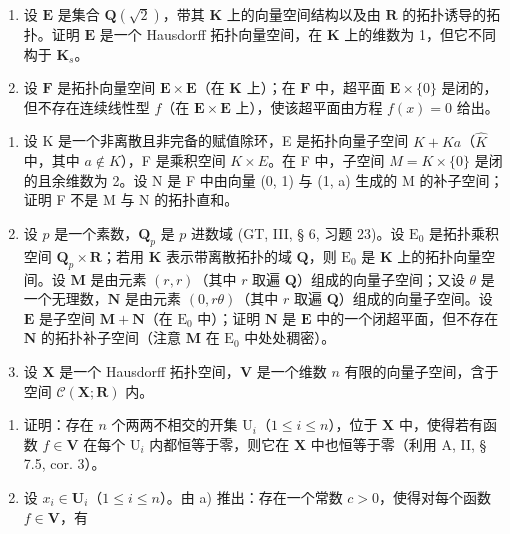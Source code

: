 \begin{enumerate}
\def\labelenumi{\alph{enumi})}
\item
  设 \(\mathbf{E}\) 是集合 \(\mathbf{Q}(\sqrt{2})\)，带其 \(\mathbf{K}\) 上的向量空间结构以及由 \(\mathbf{R}\) 的拓扑诱导的拓扑。证明 \(\mathbf{E}\) 是一个 Hausdorff 拓扑向量空间，在 \(\mathbf{K}\) 上的维数为 1，但它不同构于 \(\mathbf{K}_s\)。
\item
  设 \(\mathbf{F}\) 是拓扑向量空间 \(\mathbf{E} \times \mathbf{E}\)（在 \(\mathbf{K}\) 上）；在 \(\mathbf{F}\) 中，超平面 \(\mathbf{E} \times \{0\}\) 是闭的，但不存在连续线性型 \(f\)（在 \(\mathbf{E} \times \mathbf{E}\) 上），使该超平面由方程 \(f(x) = 0\) 给出。
\end{enumerate}

\begin{enumerate}
\def\labelenumi{\arabic{enumi})}
\setcounter{enumi}{6}
\item
  设 K 是一个非离散且非完备的赋值除环，E 是拓扑向量子空间 \(K + Ka\)（\(\hat{K}\) 中，其中 \(a \notin K\)），F 是乘积空间 \(K \times E\)。在 F 中，子空间 \(M = K \times \{0\}\) 是闭的且余维数为 2。设 N 是 F 中由向量 (0, 1) 与 (1, a) 生成的 M 的补子空间；证明 F 不是 M 与 N 的拓扑直和。
\item
  设 \(p\) 是一个素数，\(\mathbf{Q}_p\) 是 \(p\) 进数域 (GT, III, § 6, 习题 23)。设 \(\mathrm{E}_0\) 是拓扑乘积空间 \(\mathbf{Q}_p \times \mathbf{R}\)；若用 \(\mathbf{K}\) 表示带离散拓扑的域 \(\mathbf{Q}\)，则 \(\mathrm{E}_0\) 是 \(\mathbf{K}\) 上的拓扑向量空间。设 \(\mathbf{M}\) 是由元素 \((r, r)\)（其中 \(r\) 取遍 \(\mathbf{Q}\)）组成的向量子空间；又设 \(\theta\) 是一个无理数，\(\mathbf{N}\) 是由元素 \((0, r\theta)\)（其中 \(r\) 取遍 \(\mathbf{Q}\)）组成的向量子空间。设 \(\mathbf{E}\) 是子空间 \(\mathbf{M} + \mathbf{N}\)（在 \(\mathrm{E}_0\) 中）；证明 \(\mathbf{N}\) 是 \(\mathbf{E}\) 中的一个闭超平面，但不存在 \(\mathbf{N}\) 的拓扑补子空间（注意 \(\mathbf{M}\) 在 \(\mathrm{E}_0\) 中处处稠密）。
\item
  设 \(\mathbf{X}\) 是一个 Hausdorff 拓扑空间，\(\mathbf{V}\) 是一个维数 \(n\) 有限的向量子空间，含于空间 \(\mathcal{C}(\mathbf{X};\mathbf{R})\) 内。
\end{enumerate}

\begin{enumerate}
\def\labelenumi{\alph{enumi})}
\item
  证明：存在 \(n\) 个两两不相交的开集 \(\mathrm{U}_i\)（\(1 \leqslant i \leqslant n\)），位于 \(\mathbf{X}\) 中，使得若有函数 \(f \in \mathbf{V}\) 在每个 \(\mathrm{U}_i\) 内都恒等于零，则它在 \(\mathbf{X}\) 中也恒等于零（利用 A, II, § 7.5, cor. 3）。
\item
  设 \(x_{i} \in \mathbf{U}_{i}\)（\(1 \leqslant i \leqslant n\)）。由 a) 推出：存在一个常数 \(c > 0\)，使得对每个函数 \(f \in \mathbf{V}\)，有
\end{enumerate}

